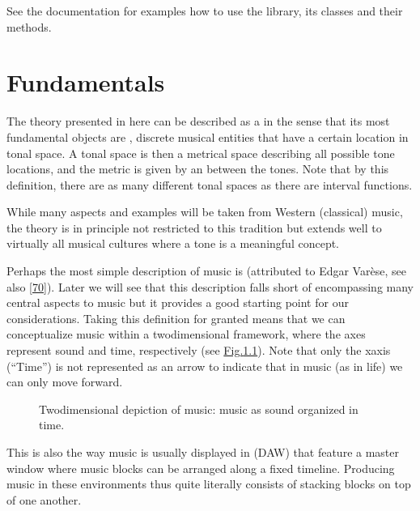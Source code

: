 \documentclass[letterpaper,10pt,english]{sphinxmanual}
\begin{document}
\sphinxAtStartPar
See the documentation {\hyperref[\detokenize{api:api}]{}} for examples how to use the library, its classes and their methods.


\chapter{Fundamentals}
\label{\detokenize{1_fundamentals:fundamentals}}\label{\detokenize{1_fundamentals::doc}}
\sphinxAtStartPar
The theory presented in here can be described as a  in the sense
that its most fundamental objects are , discrete musical entities that have
a certain location in tonal space.
A tonal space is then a metrical space describing all possible tone locations,
and the metric is given by an  between the tones. Note that by this definition,
there are as many different tonal spaces as there are interval functions.

\sphinxAtStartPar
While many aspects and examples will be taken
from Western (classical) music, the theory is in principle not restricted to this
tradition but extends well to virtually all musical cultures where a tone is a meaningful concept.

\sphinxAtStartPar
Perhaps the most simple description of music is  (attributed to
Edgar Varèse, see also {[}\hyperlink{cite.8_bibliography:id39}{70}{]}).
Later we will see that this description falls short of encompassing many central aspects to music
but it provides a good starting point for our considerations. Taking this definition for granted
means that we can conceptualize music within a two\sphinxhyphen{}dimensional framework, where the axes
represent sound and time, respectively (see \hyperref[\detokenize{1_fundamentals:fig-soundtime}]{Fig.\@ \ref{\detokenize{1_fundamentals:fig-soundtime}}}). Note that only the x\sphinxhyphen{}axis (“Time”)
is not represented as an arrow to indicate that in music (as in life) we can only move forward.
\begin{figure}[htbp]\centering\capstart{}\caption{Two\sphinxhyphen{}dimensional depiction of music: music as sound organized in time.}\label{\detokenize{1_fundamentals:id7}}\label{\detokenize{1_fundamentals:fig-soundtime}}\end{figure}
\sphinxAtStartPar
This is also the way music is usually displayed in  (DAW) that feature
a master window where music blocks can be arranged along a fixed timeline. Producing music in
these environments thus quite literally consists of stacking blocks on top of one another.
\end{document}
